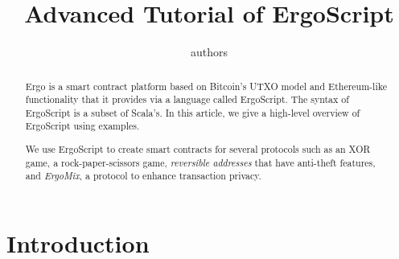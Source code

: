 \documentclass[11pt]{article}
\newcommand{\langname}{ErgoScript\xspace}
\newcommand{\mixname}{ErgoMix\xspace}
\begin{document}
\title{Advanced Tutorial of \langname}


\author{authors}


\maketitle


\begin{abstract}
Ergo is a smart contract platform based on Bitcoin's UTXO model and Ethereum-like functionality that it provides via a language called \langname. The syntax of \langname is a subset of Scala's. In this article, we give a high-level overview of \langname using examples.



We use \langname to create smart contracts for several protocols such as an XOR game, a rock-paper-scissors game, {\em reversible addresses} that have anti-theft features, and {\em \mixname}, a protocol to enhance transaction privacy. 

\end{abstract}

\section{Introduction}
\end{document}
